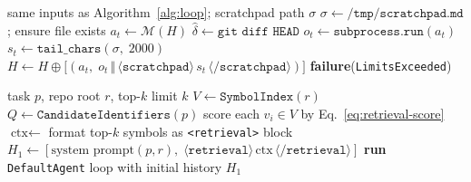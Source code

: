 \documentclass[11pt]{article}
\begin{document}
\begin{algorithm}[ht]
\caption{Scratchpad agent (\texttt{ScratchpadAgent})}
\label{alg:scratchpad}
\begin{algorithmic}[1]
\Require same inputs as Algorithm~\ref{alg:loop}; scratchpad path $\sigma$
\State $\sigma \gets \texttt{/tmp/scratchpad.md}$; ensure file exists
  \State $a_t \gets \mathcal{M}(H)$
   \Return $\hat{\delta} \gets \texttt{git diff HEAD}$ \EndIf
  \State $o_t \gets \texttt{subprocess.run}(a_t)$
  \State $s_t \gets \texttt{tail\_chars}(\sigma,\; 2000)$
  \State $H \gets H \oplus \bigl[(a_t,\; o_t \,\Vert\,
        \langle\!\texttt{scratchpad}\!\rangle\, s_t\,
        \langle\!/\!\texttt{scratchpad}\!\rangle)\bigr]$
\EndFor
\State \Return \textbf{failure}(\texttt{LimitsExceeded})
\end{algorithmic}
\end{algorithm}

\begin{algorithm}[ht]
\caption{Retrieval agent (\texttt{RetrievalAgent})}
\label{alg:retrieval}
\begin{algorithmic}[1]
\Require task $p$, repo root $r$, top-$k$ limit $k$
\State $V \gets \texttt{SymbolIndex}(r)$
\State $Q \gets \texttt{CandidateIdentifiers}(p)$
  \State score each $v_i \in V$ by Eq.~\eqref{eq:retrieval-score}
\EndFor
\State $\text{ctx} \gets$ format top-$k$ symbols as \texttt{<retrieval>} block
\State $H_1 \gets [\text{system prompt}(p, r),\;
      \langle\!\texttt{retrieval}\!\rangle\,\text{ctx}\,
      \langle\!/\!\texttt{retrieval}\!\rangle]$
\State \textbf{run} \texttt{DefaultAgent} loop with initial history $H_1$
\end{algorithmic}
\end{algorithm}
\end{document}
